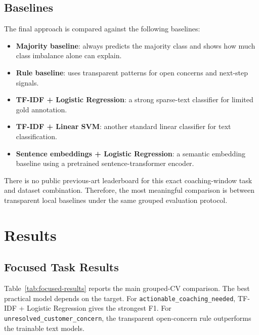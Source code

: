 \documentclass{article}
\begin{document}
\subsection{Baselines}
The final approach is compared against the following baselines:
\begin{itemize}
    \item \textbf{Majority baseline}: always predicts the majority class and shows how much class imbalance alone can explain.
    \item \textbf{Rule baseline}: uses transparent patterns for open concerns and next-step signals.
    \item \textbf{TF-IDF + Logistic Regression}: a strong sparse-text classifier for limited gold annotation.
    \item \textbf{TF-IDF + Linear SVM}: another standard linear classifier for text classification.
    \item \textbf{Sentence embeddings + Logistic Regression}: a semantic embedding baseline using a pretrained sentence-transformer encoder.
\end{itemize}

There is no public previous-art leaderboard for this exact coaching-window task and dataset combination. Therefore, the most meaningful comparison is between transparent local baselines under the same grouped evaluation protocol.

\section{Results}
\subsection{Focused Task Results}
Table~\ref{tab:focused-results} reports the main grouped-CV comparison. The best practical model depends on the target. For \texttt{actionable\_coaching\_needed}, TF-IDF + Logistic Regression gives the strongest F1. For \texttt{unresolved\_customer\_concern}, the transparent open-concern rule outperforms the trainable text models.
\end{document}
